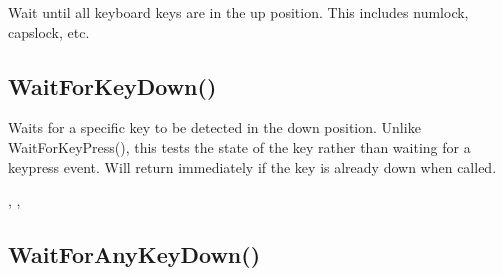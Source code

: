 \documentclass[letterpaper,10pt,english]{sphinxmanual}
\begin{document}
\sphinxAtStartPar
{}

\sphinxAtStartPar
Wait until all keyboard keys are in the up                position. This includes numlock, capslock, etc.

\ignorespaces 

\subsection{WaitForKeyDown()}
\label{\detokenize{reference/peblenvironment:waitforkeydown}}\label{\detokenize{reference/peblenvironment:index-70}}
\sphinxAtStartPar
{}

\sphinxAtStartPar
{}

\sphinxAtStartPar
Waits for a specific key to be detected in the down position. Unlike WaitForKeyPress(), this tests the state of the key rather than waiting for a keypress event. Will return immediately if the key is already down when called.

\sphinxAtStartPar
{}

\begin{sphinxVerbatim}[commandchars=\\\{\}]
\end{sphinxVerbatim}

\sphinxAtStartPar
{}

\begin{sphinxVerbatim}[commandchars=\\\{\}]
\end{sphinxVerbatim}

\sphinxAtStartPar
{}

\sphinxAtStartPar
{}, , 

\ignorespaces 

\subsection{WaitForAnyKeyDown()}
\label{\detokenize{reference/peblenvironment:waitforanykeydown}}\label{\detokenize{reference/peblenvironment:index-71}}
\sphinxAtStartPar
{}
\end{document}
